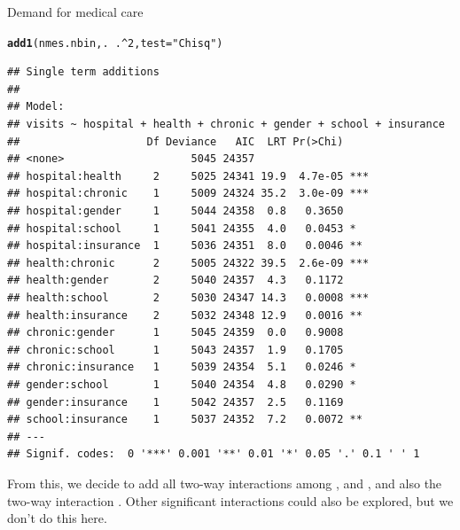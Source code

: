 \documentclass[11pt]{book}\usepackage[]{graphicx}\usepackage[]{color}
\makeatletter
\newcommand{\hlnum}[1]{\textcolor[rgb]{0.686,0.059,0.569}{#1}}%
\newcommand{\hlstr}[1]{\textcolor[rgb]{0.192,0.494,0.8}{#1}}%
\newcommand{\hlopt}[1]{\textcolor[rgb]{0,0,0}{#1}}%
\newcommand{\hlstd}[1]{\textcolor[rgb]{0.345,0.345,0.345}{#1}}%
\newcommand{\hlkwc}[1]{\textcolor[rgb]{0.333,0.667,0.333}{#1}}%
\newcommand{\hlkwd}[1]{\textcolor[rgb]{0.737,0.353,0.396}{\textbf{#1}}}%
\newenvironment{kframe}{%
 \def\at@end@of@kframe{}%
 \ifinner\ifhmode%
  \def\at@end@of@kframe{\end{minipage}}%
  \begin{minipage}{\columnwidth}%
 \fi\fi%
 \def\FrameCommand##1{\hskip\@totalleftmargin \hskip-\fboxsep
 \colorbox{shadecolor}{##1}\hskip-\fboxsep
     \hskip-\linewidth \hskip-\@totalleftmargin \hskip\columnwidth}%
 \MakeFramed {\advance\hsize-\width
   \@totalleftmargin\z@ \linewidth\hsize
   \@setminipage}}%
 {\par\unskip\endMakeFramed%
 \at@end@of@kframe}
\newenvironment{knitrout}{}{} %
\renewenvironment{knitrout}{\small\renewcommand{\baselinestretch}{.85}}{} %
\makeatother
\begin{document}
\begin{Example}[nmes2]{Demand for medical care}
\begin{knitrout}
\color{fgcolor}\begin{kframe}
\begin{alltt}
\hlkwd{add1}\hlstd{(nmes.nbin, .} \hlopt{~} \hlstd{.}\hlopt{^}\hlnum{2}\hlstd{,} \hlkwc{test}\hlstd{=}\hlstr{"Chisq"}\hlstd{)}
\end{alltt}
\begin{verbatim}
## Single term additions
## 
## Model:
## visits ~ hospital + health + chronic + gender + school + insurance
##                    Df Deviance   AIC  LRT Pr(>Chi)    
## <none>                    5045 24357                  
## hospital:health     2     5025 24341 19.9  4.7e-05 ***
## hospital:chronic    1     5009 24324 35.2  3.0e-09 ***
## hospital:gender     1     5044 24358  0.8   0.3650    
## hospital:school     1     5041 24355  4.0   0.0453 *  
## hospital:insurance  1     5036 24351  8.0   0.0046 ** 
## health:chronic      2     5005 24322 39.5  2.6e-09 ***
## health:gender       2     5040 24357  4.3   0.1172    
## health:school       2     5030 24347 14.3   0.0008 ***
## health:insurance    2     5032 24348 12.9   0.0016 ** 
## chronic:gender      1     5045 24359  0.0   0.9008    
## chronic:school      1     5043 24357  1.9   0.1705    
## chronic:insurance   1     5039 24354  5.1   0.0246 *  
## gender:school       1     5040 24354  4.8   0.0290 *  
## gender:insurance    1     5042 24357  2.5   0.1169    
## school:insurance    1     5037 24352  7.2   0.0072 ** 
## ---
## Signif. codes:  0 '***' 0.001 '**' 0.01 '*' 0.05 '.' 0.1 ' ' 1
\end{verbatim}
\end{kframe}
\end{knitrout}
\noindent From this, we decide to add all two-way interactions among
,  and , and also the
two-way interaction .  Other significant interactions
could also be explored, but we don't do this here.


\end{Example}
\end{document}
